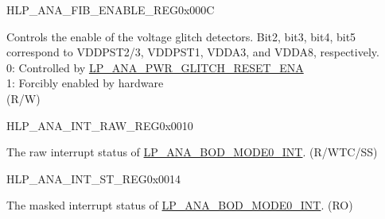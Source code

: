 \begin{register}{H}{LP\_ANA\_FIB\_ENABLE\_REG}{0x000C}\label{regdesc:LPANAFIBENABLEREG}
%
\regnewline%
\begin{regdesc}\begin{reglist}
\label{fielddesc:LPANAANAFIBENA}\item [LP\_ANA\_ANA\_FIB\_ENA]  Controls the enable of the voltage glitch detectors. Bit2, bit3, bit4, bit5 correspond to VDDPST2/3, VDDPST1, VDDA3, and VDDA8, respectively.\\
0: Controlled by \hyperref[fielddesc:LPANAPWRGLITCHRESETENA]{LP\_ANA\_PWR\_GLITCH\_RESET\_ENA} \\
1: Forcibly enabled by hardware\\
(R/W)
\end{reglist}\end{regdesc}
\end{register}

\begin{register}{H}{LP\_ANA\_INT\_RAW\_REG}{0x0010}\label{regdesc:LPANAINTRAWREG}
%
%
\regnewline%
\begin{regdesc}\begin{reglist}
\label{fielddesc:LPANABODMODE0INTRAW}\item [LP\_ANA\_BOD\_MODE0\_INT\_RAW] The raw interrupt status of \hyperref[int:LPANABODMODE0INT]{LP\_ANA\_BOD\_MODE0\_INT}. (R/WTC/SS)
\end{reglist}\end{regdesc}
\end{register}

\begin{register}{H}{LP\_ANA\_INT\_ST\_REG}{0x0014}\label{regdesc:LPANAINTSTREG}
%
%
\regnewline%
\begin{regdesc}\begin{reglist}
\label{fielddesc:LPANABODMODE0INTST}\item [LP\_ANA\_BOD\_MODE0\_INT\_ST] The masked interrupt status of \hyperref[int:LPANABODMODE0INT]{LP\_ANA\_BOD\_MODE0\_INT}. (RO)
\end{reglist}\end{regdesc}
\end{register}

